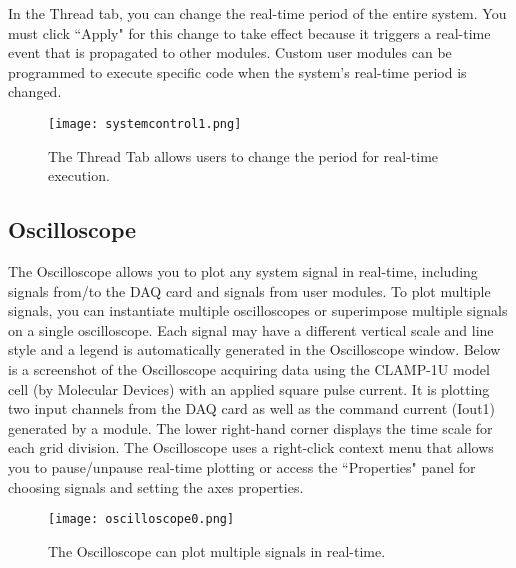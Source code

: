 In the Thread tab, you can change the real-time period of the entire system. You must click ``Apply" for this change to take effect because it triggers a real-time event that is propagated to other modules. Custom user modules can be programmed to execute specific code when the system's real-time period is changed.

\begin{figure}[h]
\begin{center}
\texttt{[image: systemcontrol1.png]} 
\caption[System Control Panel: Thread Tab]{The Thread Tab allows users to change the period for real-time execution.} 
\end{center}
\label{fig:systemcontrolpanel1}
\end{figure}

\subsection{Oscilloscope}
\label{Oscilloscope}

The Oscilloscope allows you to plot any system signal in real-time, including signals from/to the DAQ card and signals from user modules. To plot multiple signals, you can instantiate multiple oscilloscopes or superimpose multiple signals on a single oscilloscope. Each signal may have a different vertical scale and line style and a legend is automatically generated in the Oscilloscope window. Below is a screenshot of the Oscilloscope acquiring data using the CLAMP-1U model cell (by Molecular Devices) with an applied square pulse current. It is plotting two input channels from the DAQ card as well as the command current (Iout1) generated by a module. The lower right-hand corner displays the time scale for each grid division. \attention The Oscilloscope uses a right-click context menu that allows you to pause/unpause real-time plotting or access the ``Properties" panel for choosing signals and setting the axes properties.

\begin{figure}[h]
\begin{maxipage}
\begin{center}
\texttt{[image: oscilloscope0.png]} 
\caption[Oscilloscope]{The Oscilloscope can plot multiple signals in real-time.} 
\end{center}
\label{fig:oscilloscopel0}
\end{maxipage}
\end{figure}

